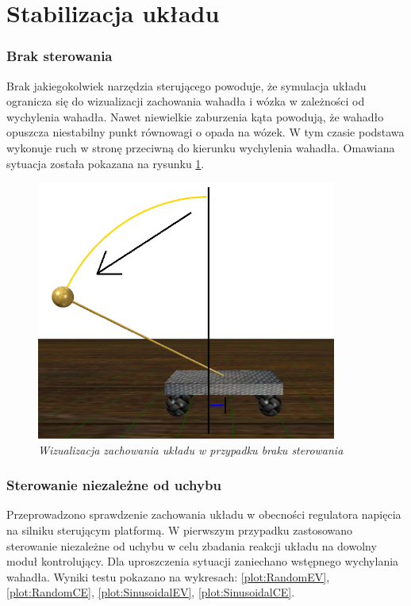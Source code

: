 \documentclass[12pt, oneside]{report}
\theoremstyle{definition}
\begin{document}
\section{Stabilizacja układu}
\subsubsection{Brak sterowania}
Brak jakiegokolwiek narzędzia sterującego powoduje, że symulacja układu ogranicza się do wizualizacji zachowania wahadła i wózka w zależności od wychylenia wahadła. Nawet niewielkie zaburzenia kąta powodują, że wahadło opuszcza niestabilny punkt równowagi o opada na wózek. W tym czasie podstawa wykonuje ruch w stronę przeciwną do kierunku wychylenia wahadła. Omawiana sytuacja została pokazana na rysunku \ref{figure:ModelWithoutControl}.

\begin{figure}[H]
	\centering
		\includegraphics[width = 280pt]{ModelWithoutControl} 
		\caption{\textit{Wizualizacja zachowania układu w przypadku braku sterowania}}
		\label{figure:ModelWithoutControl}
\end{figure}

\subsubsection{Sterowanie niezależne od uchybu}
Przeprowadzono sprawdzenie zachowania układu w obecności regulatora napięcia na silniku sterującym platformą. W pierwszym przypadku zastosowano sterowanie niezależne od uchybu w celu zbadania reakcji układu na dowolny moduł kontrolujący. Dla uproszczenia sytuacji zaniechano wstępnego wychylania wahadła. Wyniki testu pokazano na wykresach: \ref{plot:RandomEV}, \ref{plot:RandomCE}, \ref{plot:SinusoidalEV}, \ref{plot:SinusoidalCE}.
\end{document}
